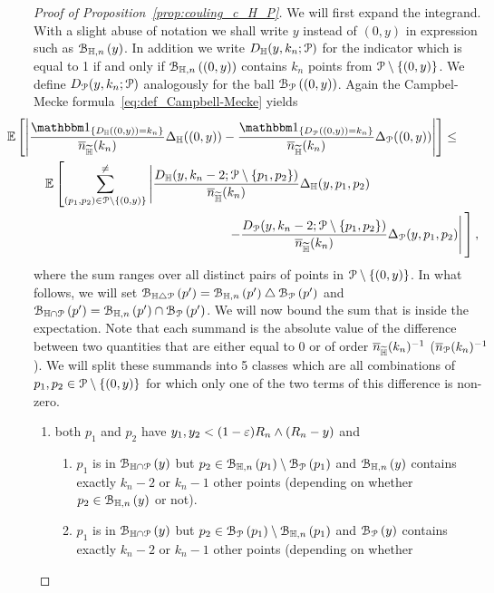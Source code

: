 \begin{proof}[Proof of Proposition~\ref{prop:couling_c_H_P}]
We will first expand the integrand. With a slight abuse of notation we shall write $y$ instead of $(0,y)$ in expression such as ${\mathcal B}_{\mathbb{H},n}\left(y\right)$. In addition we write $D_{\mathbb{H}}(y,k_n;{\mathcal P})$ for the indicator which is equal to 1 if and only if ${\mathcal B}_{\mathbb{H},n}\left((0,y)\right)$ contains $k_n$ points from ${\mathcal P} \setminus \{(0,y)\}$. We define $D_{{\mathcal P}}(y,k_n;{\mathcal P})$ analogously for the ball ${\mathcal B}_{{\mathcal P}}\left((0,y)\right)$. Again the Campbel-Mecke formula~\eqref{eq:def_Campbell-Mecke} yields
\begin{align*} 
 &\hspace{-30pt}\Exp{ \left| \frac{\ind{D_\H((0,y)) = k_n}}{\expH} \Delta_\H ((0,y) )
        - \frac{\ind{D_\Pcal((0,y)) = k_n}}{\expH}  \Delta_\Pcal ((0,y))
        \right|}\leq \\
 & {\mathbb E} \left[ \sum_{(p_1,p_2) \in \Pcal \setminus \{(0,y)\}}^{\not =} 
  \left| \frac{D_{\H}(y,k_n-2; \Pcal \setminus \{p_1,p_2 \})}{\expH} \Delta_\H (y,p_1,p_2) \right. \right.\\
  & \hspace{5cm} 
\left. \left. - \frac{D_{\Pcal} (y,k_n-2;\Pcal \setminus \{p_1,p_2\})}{\expH} \Delta_{\Pcal} (y,p_1,p_2)
   \right| \vphantom{\sum_{p_1,p_2 \in \Pcal \setminus \{(0,y)\}}^{\not =}}\right],
\end{align*}
where the sum ranges over all distinct pairs of points in ${\mathcal P} \setminus \{ (0,y)\}$. In what follows, we will set ${\mathcal B}_{\mathbb{H} \bigtriangleup {\mathcal P}}\left(p'\right) = {\mathcal B}_{\mathbb{H},n}\left(p'\right) \bigtriangleup {\mathcal B}_{{\mathcal P}}\left(p'\right)$ and ${\mathcal B}_{\mathbb{H} \cap {\mathcal P}}\left(p'\right) ={\mathcal B}_{\mathbb{H},n}\left(p'\right) \cap {\mathcal B}_{{\mathcal P}}\left(p'\right)$. 
We will now bound the sum that is inside the expectation. Note that each summand is the absolute value of the difference between two quantities that are either equal to 0 or of order $\overline{n}_{\widetilde{\mathbb{H}}}(k_n)^{-1}$ ($\overline{n}_{{\mathcal P}}(k_n)^{-1}$). We will split these summands into 5 classes which are all combinations of $p_1, p_2\in {\mathcal P} \setminus \{(0,y)\}$ for which only one of the two terms of this difference is non-zero. 
\begin{enumerate} 
\item both $p_1$ and $p_2$ have $y_1,y_2 < (1-\varepsilon ) R_n \wedge (R_n-y)$ and 
\begin{enumerate}
\item $p_1$ is in ${\mathcal B}_{\mathbb{H} \cap {\mathcal P}}\left(y\right)$ but $p_2 \in {\mathcal B}_{\mathbb{H},n}\left(p_1\right) \setminus {\mathcal B}_{{\mathcal P}}\left(p_1\right)$ 
and ${\mathcal B}_{\mathbb{H},n}\left(y\right)$ contains exactly $k_n-2$ or $k_n-1$ other points (depending on whether 
$p_2 \in {\mathcal B}_{\mathbb{H},n}\left(y\right)$ or not).
\item $p_1$ is in ${\mathcal B}_{\mathbb{H} \cap {\mathcal P}}\left(y\right)$ but $p_2 \in {\mathcal B}_{{\mathcal P}}\left(p_1\right) \setminus {\mathcal B}_{\mathbb{H},n}\left(p_1\right)$ 
and ${\mathcal B}_{{\mathcal P}}\left(y\right)$ contains exactly $k_n-2$ or $k_n-1$ other points (depending on whether 

\end{enumerate}
\end{enumerate}
\end{proof}
